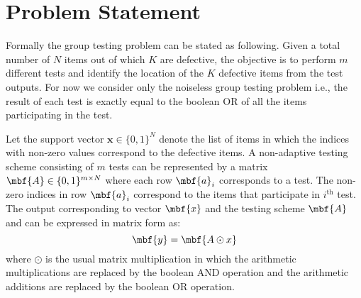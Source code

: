 \documentclass[conference,twocolumn]{IEEEtran}
\begin{document}

\section{Problem Statement}
Formally the group testing problem can be stated as following. Given a total number of $N$ items out of which $K$ are defective, the objective is to perform $m$ different tests and identify the location of the $K$ defective items from the test outputs. For now we consider only the noiseless group testing problem i.e., the result of each test is exactly equal to the boolean OR of all the items participating in the test. 

Let the support vector $\mathbf{x}\in\{0,1\}^{N}$ denote the list of items in which the indices with non-zero values correspond to the defective items. A non-adaptive testing scheme consisting of $m$ tests can be represented by a matrix $\mbf{A}\in\{0,1\}^{m\times N}$ where each row $\mbf{a}_{i}$ corresponds to a test. The non-zero indices in row $\mbf{a}_i$ correspond to the items that participate in $i^{\text{th}}$ test. The output corresponding to vector $\mbf{x}$ and the testing scheme $\mbf{A}$ and can be expressed in matrix form as:
\begin{equation*}
\mbf{y}=\mbf{A\odot x}
\end{equation*}
where $\odot$ is the usual matrix multiplication in which the arithmetic multiplications are replaced by the boolean AND operation and the arithmetic additions are replaced by the boolean OR operation.
\end{document}

